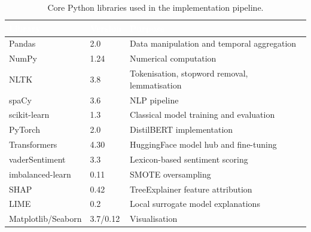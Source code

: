 \begin{table}[H]
\centering
\caption{Core Python libraries used in the implementation pipeline.}
\label{tab:libraries}
\begin{tabularx}{\textwidth}{@{}l l X@{}}
  \toprule
  \rowcolor{uwsblue!90}
  \textcolor{white}{\textbf{Library}} & \textcolor{white}{\textbf{Version}} & \textcolor{white}{\textbf{Purpose}} \\
  \midrule
  \rowcolor{tablegrey}
  Pandas            & 2.0        & Data manipulation and temporal aggregation \\
  NumPy             & 1.24       & Numerical computation \\
  \rowcolor{tablegrey}
  NLTK              & 3.8        & Tokenisation, stopword removal, lemmatisation \\
  spaCy             & 3.6        & NLP pipeline \\
  \rowcolor{tablegrey}
  scikit-learn      & 1.3        & Classical model training and evaluation \\
  PyTorch           & 2.0        & DistilBERT implementation \\
  \rowcolor{tablegrey}
  Transformers      & 4.30       & HuggingFace model hub and fine-tuning \\
  vaderSentiment    & 3.3        & Lexicon-based sentiment scoring \\
  \rowcolor{tablegrey}
  imbalanced-learn  & 0.11       & SMOTE oversampling \\
  SHAP              & 0.42       & TreeExplainer feature attribution \\
  \rowcolor{tablegrey}
  LIME              & 0.2        & Local surrogate model explanations \\
  Matplotlib/Seaborn & 3.7/0.12  & Visualisation \\
  \bottomrule
\end{tabularx}
\end{table}
